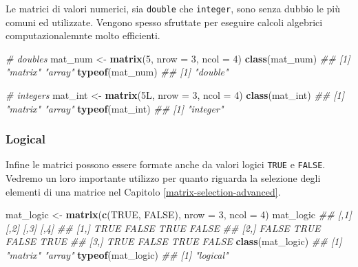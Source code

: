 \documentclass[
]{book}
\newenvironment{Shaded}{\begin{snugshade}}{\end{snugshade}}
\newcommand{\CommentTok}[1]{\textcolor[rgb]{0.56,0.35,0.01}{\textit{#1}}}
\newcommand{\DataTypeTok}[1]{\textcolor[rgb]{0.13,0.29,0.53}{#1}}
\newcommand{\DecValTok}[1]{\textcolor[rgb]{0.00,0.00,0.81}{#1}}
\newcommand{\KeywordTok}[1]{\textcolor[rgb]{0.13,0.29,0.53}{\textbf{#1}}}
\newcommand{\NormalTok}[1]{#1}
\newcommand{\OtherTok}[1]{\textcolor[rgb]{0.56,0.35,0.01}{#1}}
\newcommand{\StringTok}[1]{\textcolor[rgb]{0.31,0.60,0.02}{#1}}
\begin{document}
Le matrici di valori numerici, sia \texttt{double} che \texttt{integer}, sono senza dubbio le più comuni ed utilizzate. Vengono spesso sfruttate per eseguire calcoli algebrici computazionalemnte molto efficienti.

\begin{Shaded}
\begin{Highlighting}[]
\CommentTok{# doubles}
\NormalTok{mat_num <-}\StringTok{ }\KeywordTok{matrix}\NormalTok{(}\DecValTok{5}\NormalTok{, }\DataTypeTok{nrow =} \DecValTok{3}\NormalTok{, }\DataTypeTok{ncol =} \DecValTok{4}\NormalTok{)}
\KeywordTok{class}\NormalTok{(mat_num)}
\CommentTok{## [1] "matrix" "array"}
\KeywordTok{typeof}\NormalTok{(mat_num)}
\CommentTok{## [1] "double"}

\CommentTok{# integers}
\NormalTok{mat_int <-}\StringTok{ }\KeywordTok{matrix}\NormalTok{(5L, }\DataTypeTok{nrow =} \DecValTok{3}\NormalTok{, }\DataTypeTok{ncol =} \DecValTok{4}\NormalTok{)}
\KeywordTok{class}\NormalTok{(mat_int)}
\CommentTok{## [1] "matrix" "array"}
\KeywordTok{typeof}\NormalTok{(mat_int)}
\CommentTok{## [1] "integer"}
\end{Highlighting}
\end{Shaded}

\hypertarget{logical}{%
\subsubsection*{Logical}\label{logical}}

Infine le matrici possono essere formate anche da valori logici \texttt{TRUE} e \texttt{FALSE}. Vedremo un loro importante utilizzo per quanto riguarda la selezione degli elementi di una matrice nel Capitolo \ref{matrix-selection-advanced}.

\begin{Shaded}
\begin{Highlighting}[]
\NormalTok{mat_logic <-}\StringTok{ }\KeywordTok{matrix}\NormalTok{(}\KeywordTok{c}\NormalTok{(}\OtherTok{TRUE}\NormalTok{, }\OtherTok{FALSE}\NormalTok{), }\DataTypeTok{nrow =} \DecValTok{3}\NormalTok{, }\DataTypeTok{ncol =} \DecValTok{4}\NormalTok{)}
\NormalTok{mat_logic}
\CommentTok{##       [,1]  [,2]  [,3]  [,4]}
\CommentTok{## [1,]  TRUE FALSE  TRUE FALSE}
\CommentTok{## [2,] FALSE  TRUE FALSE  TRUE}
\CommentTok{## [3,]  TRUE FALSE  TRUE FALSE}
\KeywordTok{class}\NormalTok{(mat_logic)}
\CommentTok{## [1] "matrix" "array"}
\KeywordTok{typeof}\NormalTok{(mat_logic)}
\CommentTok{## [1] "logical"}
\end{Highlighting}
\end{Shaded}
\end{document}
